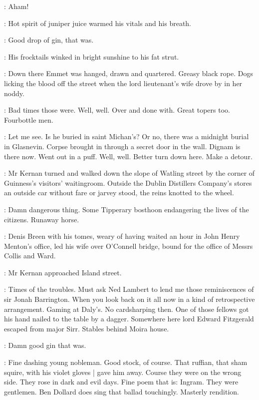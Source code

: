 :
Aham!

:
Hot spirit of juniper juice warmed his vitals and his breath.

:
Good drop of gin, that was.

:
His frocktails winked in bright sunshine to his fat strut.

:
Down there Emmet was hanged, drawn and quartered.
Greasy black rope.
Dogs licking the blood off the street
when the lord lieutenant's wife drove by in her noddy.

:
Bad times those were.
Well, well.
Over and done with.
Great topers too.
Fourbottle men.

:
Let me see.
Is he buried in saint Michan's?
Or no, there was a midnight burial in Glasnevin.
Corpse brought in through a secret door in the wall.
Dignam is there now.
Went out in a puff.
Well, well.
Better turn down here.
Make a detour.

:
Mr Kernan turned and walked down the slope of Watling street
by the corner of Guinness's visitors' waitingroom.
Outside the Dublin Distillers Company's stores
an outside car without fare or jarvey stood,
the reins knotted to the wheel.

:
Damn dangerous thing.
Some Tipperary bosthoon
endangering the lives of the citizens.
Runaway horse.

\begin{interject}
    :
    Denis Breen with his tomes,
    weary of having waited an hour in John Henry Menton's office,
    led his wife over O'Connell bridge,
    bound for the office
    of Messrs Collis and Ward.
\end{interject}

:
Mr Kernan approached Island street.

:
Times of the troubles.
Must ask Ned Lambert to lend me
those reminiscences of sir Jonah Barrington.
When you look back on it all now
in a kind of retrospective arrangement.
Gaming at Daly's.
No cardsharping then.
One of those fellows got his hand nailed to the table by a dagger.
Somewhere here lord Edward Fitzgerald escaped from major Sirr.
Stables behind Moira house.

:
Damn good gin that was.

:
Fine dashing young nobleman.
Good stock, of course.
That ruffian, that sham squire, with his violet gloves |
gave him away.
Course they were on the wrong side.
They rose in dark and evil days.
Fine poem that is:
Ingram.
They were gentlemen.
Ben Dollard does sing that ballad touchingly.
Masterly rendition.

